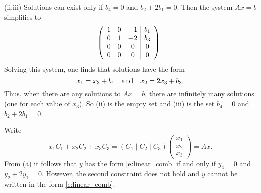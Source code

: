 \documentclass{ximera}
\begin{document}
\begin{exercise}
\begin{solution}
\begin{enumeratea}
(ii,iii)  Solutions can exist only if  $b_4 = 0$ and $b_2 + 2b_1 = 0$. Then the system $Ax = b$  simplifies to 
\[
\left(\begin{array}{ccc|c}
1 & 0 & -1 & b_1\\  
0 & 1 & -2 & b_3 \\ 
0 & 0 & 0 & 0\\ 
0 & 0 & 0 & 0
\end{array}\right)\ldotp
\]
Solving this system, one finds that solutions have the form   
\[
x_1 = x_3 + b_1 \quad\mbox{and}\quad x_2 = 2x_3 + b_3.
\] 
Thus, when there are any solutions to $Ax=b$, there are infinitely many solutions (one for each value of $x_3$).  So (ii) is the empty set and (iii) is the set  $b_4=0$ and $b_2 + 2b_1 = 0$.

\item  Write
\[
x_1C_1 + x_2C_2 + x_3C_3 = (C_1\mid C_2\mid C_3)\left(\begin{array}{c} x_1\\x_2\\x_3 \end{array}\right) = Ax. 
\]
From (a) it follows that $y$ has the form \eqref{e:linear_comb}
 if and only if $y_4 = 0$ and $y_2 + 2y_1 = 0$. However, the second constraint does not hold and $y$ cannot be written in the form \eqref{e:linear_comb}.
\end{enumeratea}
\end{solution}
\end{exercise}
\end{document}
